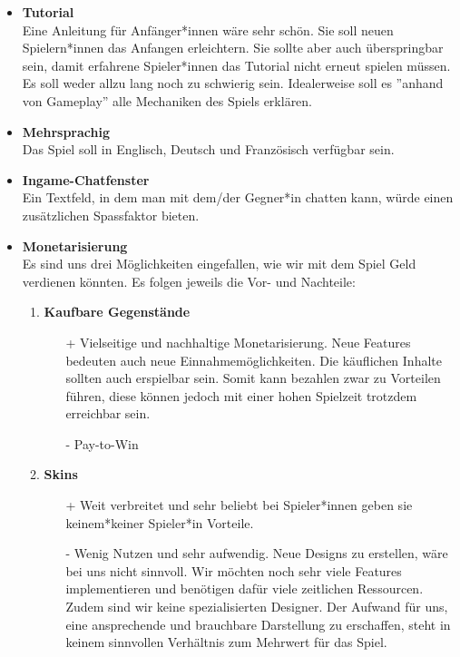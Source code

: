 \begin{itemize}
    \item \textbf{\gls{Tutorial}} \\
        Eine Anleitung für Anfänger*innen wäre sehr schön. Sie soll neuen Spielern*innen das Anfangen erleichtern. Sie sollte aber auch überspringbar sein,
        damit erfahrene Spieler*innen das Tutorial nicht erneut spielen müssen. Es soll weder allzu lang noch zu schwierig sein. Idealerweise soll es ''anhand von Gameplay'' alle Mechaniken des Spiels
        erklären.
    \item \textbf{Mehrsprachig} \\
        Das Spiel soll in Englisch, Deutsch und Französisch verfügbar sein.
    \item \textbf{\gls{Ingame}-Chatfenster}\\
        Ein Textfeld, in dem man mit dem/der Gegner*in chatten kann, würde einen zusätzlichen Spassfaktor bieten.
    \item \textbf{Monetarisierung} \\
    Es sind uns drei Möglichkeiten eingefallen, wie wir mit dem Spiel Geld verdienen könnten. Es folgen jeweils die Vor- und Nachteile:
    \begin{enumerate}
        \item \textbf{Kaufbare Gegenstände}
        \begin{itemize}
            \item[+] Vielseitige und nachhaltige Monetarisierung. Neue Features bedeuten auch neue Einnahmemöglichkeiten. Die käuflichen Inhalte sollten
                        auch erspielbar sein. Somit kann bezahlen zwar zu Vorteilen führen, diese können jedoch mit einer hohen Spielzeit trotzdem erreichbar sein.
            \item[-] \gls{Pay-to-Win}
        \end{itemize}
        \item \textbf{\gls{Skins}}
        \begin{itemize}
            \item[+] Weit verbreitet und sehr beliebt bei Spieler*innen geben sie keinem*keiner Spieler*in Vorteile.
            \item[-] Wenig Nutzen und sehr aufwendig. Neue Designs zu erstellen, wäre bei uns nicht sinnvoll.
                        Wir möchten noch sehr viele Features implementieren und benötigen dafür viele zeitlichen Ressourcen. Zudem sind wir keine spezialisierten Designer. Der Aufwand für uns, eine ansprechende und brauchbare Darstellung zu erschaffen, steht in keinem sinnvollen Verhältnis zum Mehrwert für das Spiel.

\end{itemize}
\end{enumerate}
\end{itemize}
